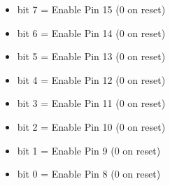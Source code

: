 \begin{itemize}
\item bit 7 = Enable Pin 15 (0 on reset)
\item bit 6 = Enable Pin 14 (0 on reset)
\item bit 5 = Enable Pin 13 (0 on reset)
\item bit 4 = Enable Pin 12 (0 on reset)
\item bit 3 = Enable Pin 11 (0 on reset)
\item bit 2 = Enable Pin 10 (0 on reset)
\item bit 1 = Enable Pin 9 (0 on reset)
\item bit 0 = Enable Pin 8 (0 on reset)
\end{itemize}

